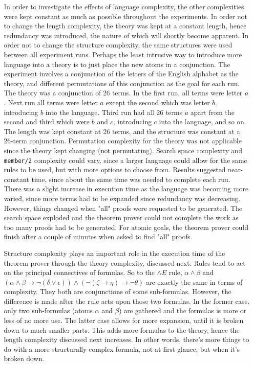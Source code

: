 \documentclass[11pt,twoside,a4paper]{report}
\begin{document}
In order to investigate the effects of language complexity, the other complexities were kept constant as much as possible throughout the experiments. In order not to change the length complexity, the theory was kept at a constant length, hence redundancy was introduced, the nature of which will shortly become apparent. In order not to change the structure complexity, the same structures were used between all experiment runs. Perhaps the least intrusive way to introduce more language into a theory is to just place the new atoms in a conjunction. The experiment involves a conjunction of the letters of the English alphabet as the theory, and different permutations of this conjunction as the goal for each run. The theory was a conjunction of 26 terms. In the first run, all terms were letter $a$. Next run all terms were letter $a$ except the second which was letter $b$, introducing $b$ into the language. Third run had all 26 terms $a$ apart from the second and third which were $b$ and $c$, introducing $c$ into the language, and so on. The length was kept constant at 26 terms, and the structure was constant at a 26-term conjunction. Permutation complexity for the theory was not applicable since the theory kept changing (not permutating). Search space complexity and \lstinline$member/2$ complexity could vary, since a larger language could allow for the same rules to be used, but with more options to choose from. Results suggested near-constant time, since about the same time was needed to complete each run. There was a slight increase in execution time as the language was becoming more varied, since more terms had to be expanded since redundancy was decreasing. However, things changed when "all" proofs were requested to be generated. The search space exploded and the theorem prover could not complete the work as too many proofs had to be generated. For atomic goals, the theorem prover could finish after a couple of minutes when asked to find "all" proofs.

Structure complexity plays an important role in the execution time of the theorem prover through the theory complexity, discussed next. Rules tend to act on the principal connectives of formulas. So to the $\wedge E$ rule, $\alpha\wedge\beta$ and $(\alpha\wedge\beta\rightarrow\neg(\delta\vee\epsilon))\wedge(\neg(\zeta\rightarrow\eta)\rightarrow\neg\theta)$ are exactly the same in terms of complexity. They both are conjunctions of some sub-formulas. However, the difference is made after the rule acts upon those two formulas. In the former case, only two sub-formulas (atoms $\alpha$ and $\beta$) are gathered and the formulas is more or less of no more use. The latter case allows for more expansion, until it is broken down to much smaller parts. This adds more formulas to the theory, hence the length complexity discussed next increases. In other words, there's more things to do with a more structurally complex formula, not at first glance, but when it's broken down.
\end{document}
